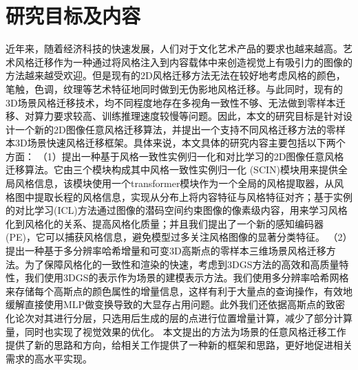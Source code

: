 

\section{研究目标及内容}
近年来，随着经济科技的快速发展，人们对于文化艺术产品的要求也越来越高。艺术风格迁移作为一种通过将风格注入到内容载体中来创造视觉上有吸引力的图像的方法越来越受欢迎。但是现有的2D风格迁移方法无法在较好地考虑风格的颜色，笔触，色调，纹理等艺术特征地同时做到无伪影地风格迁移。与此同时，现有的3D场景风格迁移技术，均不同程度地存在多视角一致性不够、无法做到零样本迁移、对算力要求较高、训练推理速度较慢等问题。因此，本文的研究目标是针对设计一个新的2D图像任意风格迁移算法，并提出一个支持不同风格迁移方法的零样本3D场景快速风格迁移框架。具体来说，本文具体的研究内容主要包括以下两个方面：
\newline \indent
（1）提出一种基于风格一致性实例归一化和对比学习的2D图像任意风格迁移算法。它由三个模块构成其中风格一致性实例归一化 (SCIN)模块用来提供全局风格信息，该模块使用一个transformer模块作为一个全局的风格提取器，从风格图中提取长程的风格信息，实现从分布上将内容特征与风格特征对齐；基于实例的对比学习(ICL)方法通过图像的潜码空间约束图像的像素级内容，用来学习风格化到风格化的关系、提高风格化质量；并且我们提出了一个新的感知编码器(PE)，它可以捕获风格信息，避免模型过多关注风格图像的显著分类特征。   
\newline \indent
（2）提出一种基于多分辨率哈希增量和可变3D高斯点的零样本三维场景风格迁移方法。为了保障风格化的一致性和渲染的快速，考虑到3DGS方法的高效和高质量特性，我们使用3DGS的表示作为场景的建模表示方法。我们使用多分辨率哈希网格来存储每个高斯点的颜色属性的增量信息，这样有利于大量点的查询操作，有效地缓解直接使用MLP做变换导致的大显存占用问题。此外我们还依据高斯点的致密化论次对其进行分层，只选用后生成的层的点进行位置增量计算，减少了部分计算量，同时也实现了视觉效果的优化。
\newline \indent	
本文提出的方法为场景的任意风格迁移工作提供了新的思路和方向，给相关工作提供了一种新的框架和思路，更好地促进相关需求的高水平实现。


